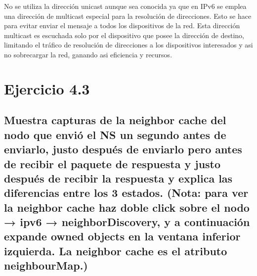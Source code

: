 No se utiliza la dirección unicast aunque sea conocida ya que en IPv6 se emplea una dirección de multicast especial para la resolución de direcciones. Esto se hace para evitar enviar el mensaje a todos los dispositivos de la red. Esta dirección multicast es escuchada solo por el dispositivo que posee la dirección de destino, limitando el tráfico de resolución de direcciones a los dispositivos interesados y asi no sobrecargar la red, ganando asi eficiencia y recursos.


\section{Ejercicio 4.3}
\subsection{Muestra capturas de la neighbor cache del nodo que envió el NS un segundo antes de enviarlo, justo después de enviarlo pero antes de recibir el paquete de respuesta y justo después de recibir la respuesta y explica las diferencias entre los 3 estados. (Nota: para ver la neighbor cache haz doble click sobre el nodo → ipv6 → neighborDiscovery, y a continuación expande owned objects en la ventana inferior izquierda. La neighbor cache es el atributo neighbourMap.)}



